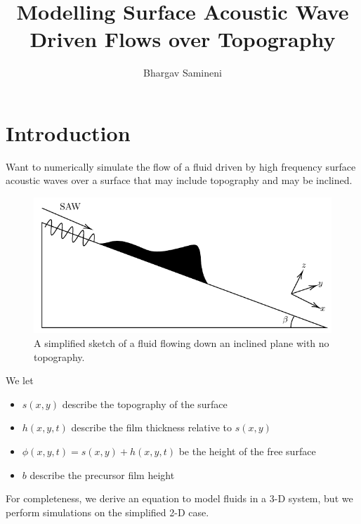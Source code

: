 \documentclass[compress, xcolor=dvipsnames]{beamer}
\title{Modelling Surface Acoustic Wave Driven Flows over Topography}
\author{Bhargav Samineni}
\newcommand{\func}[2]{\ensuremath{#1\!\lrp{#2}}}
\newcommand{\lrp}[1]{\left( #1 \right)}
\begin{document}
   
    \frame{\titlepage}     

    \section{Introduction}
    \begin{frame}
        Want to numerically simulate the flow of a fluid driven by 
        high frequency surface acoustic waves over a surface that may include topography
        and may be inclined. 

        \begin{figure}[hb]
            \centering
            \includegraphics[width=.75\textwidth]{images/samp_diagram.pdf}
            \caption{A simplified sketch of a fluid flowing down an inclined plane with no topography.}
            \label{fig:model_diagram}
        \end{figure}
    \end{frame}
    \begin{frame} 
        We let
        \begin{itemize}
            \item $\func{s}{x, y}$ describe the topography of the surface
            \item $\func{h}{x,y,t}$ describe the film thickness relative to $\func{s}{x,y}$ 
            \item $\func{\phi}{x,y,t} = \func{s}{x,y} + \func{h}{x,y,t}$ be the height of the free surface
            \item $b$ describe the precursor film height
        \end{itemize}

        For completeness, we derive an equation to model fluids in a 
        3-D system, but we perform simulations on the simplified 2-D case. 
    \end{frame}

    
    
    
\end{document}

